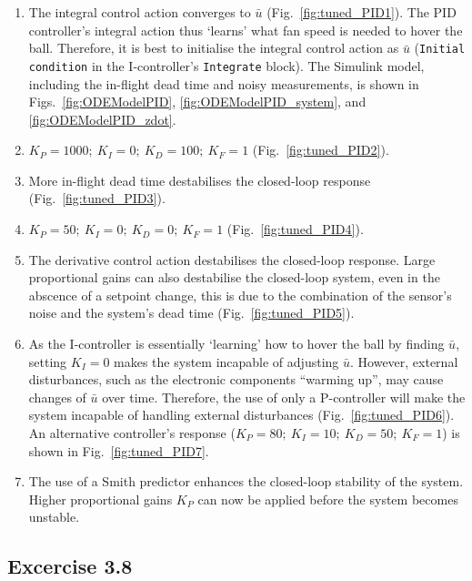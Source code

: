 \documentclass[10pt,twoside,openright]{article}
\begin{document}
\begin{enumerate}
\setlength\itemsep{0em}
\item The integral control action converges to $\bar{u}$ (Fig.~\ref{fig:tuned_PID1}). The PID controller's integral action thus `learns' what fan speed is needed to hover the ball. Therefore, it is best to initialise the integral control action as $\bar{u}$ (\texttt{Initial condition} in the I-controller's \texttt{Integrate} block). The Simulink model, including the in-flight dead time and noisy measurements, is shown in Figs.~\ref{fig:ODEModelPID}, \ref{fig:ODEModelPID_system}, and \ref{fig:ODEModelPID_zdot}.
\item $K_P=1000;~ K_I=0;~ K_D=100;~K_F=1$ (Fig.~\ref{fig:tuned_PID2}). 
\item More in-flight dead time destabilises the closed-loop response (Fig.~\ref{fig:tuned_PID3}).
\item $K_P=50;~ K_I=0;~K_D=0;~K_F=1$ (Fig.~\ref{fig:tuned_PID4}).
\item The derivative control action destabilises the closed-loop response. Large proportional gains can also destabilise the closed-loop system, even in the abscence of a setpoint change, this is due to the combination of the sensor's noise and the system's dead time (Fig.~\ref{fig:tuned_PID5}).
\item As the I-controller is essentially `learning' how to hover the ball by finding $\bar{u}$, setting $K_I = 0$ makes the system incapable of adjusting $\bar{u}$. However, external disturbances, such as the electronic components ``warming up'', may cause changes of $\bar{u}$ over time. Therefore, the use of only a P-controller will make the system incapable of handling external disturbances (Fig.~\ref{fig:tuned_PID6}). An alternative controller's response ($K_P=80;~ K_I=10;~ K_D=50;~K_F=1$) is shown in Fig.~\ref{fig:tuned_PID7}.
\item The use of a Smith predictor enhances the closed-loop stability of the system. Higher proportional gains $K_P$ can now be applied before the system becomes unstable. 
\end{enumerate}

\subsection*{Excercise 3.8}
\end{document}
